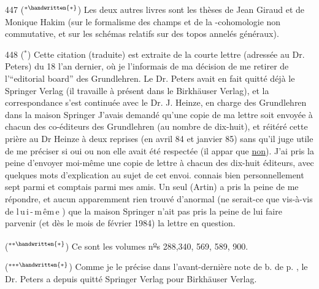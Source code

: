 
447 \quad ($^{\ast\handwritten{\ast}}$) Les deux autres livres sont les thèses de Jean Giraud et de  Monique Hakim (sur le formalisme des champs et de la -cohomologie non commutative, et sur les schémas relatifs sur des topos annelés généraux).

448 \quad ($^{\ast}$) Cette citation (traduite) est extraite de la courte lettre (adressée au Dr. Peters) du 18  l'an dernier, où je l'informais de ma décision de me retirer de l'``editorial board'' des Grundlehren. Le Dr. Peters avait en fait quitté déjà le Springer Verlag (il travaille à présent dans le Birkhäuser Verlag), et la correspondance s'est continuée avec le  Dr. J. Heinze, en charge des Grundlehren dans la maison Springer  J'avais demandé qu'une copie de ma lettre soit envoyée à chacun des co-éditeurs des Grundlehren (au nombre de dix-huit), et  réitéré cette prière au Dr Heinze\deleted{\unsure{,}} à deux reprises (en avril 84 et janvier 85) sans qu'il juge utile de me  préciser si oui ou non elle avait été respectée (il  appar que \uline{non}). J'ai pris la peine d'envoyer moi-même une copie de  lettre  à chacun des dix-huit éditeurs, avec quelques mots d'explication  au sujet de cet envoi.   connais bien personnellement sept parmi \handwritten{,}  et   comptais  parmi mes amis. Un seul \deleted{\unsure{(}} (Artin) a pris la peine de me répondre, et aucun apparemment  rien trouvé d'anormal  (ne serait-ce que vis-à-vis de \mbox{l\,u\,i\,-\,m\,êm\,e} ) que la maison Springer n'ait pas  pris la peine de lui faire parvenir   (et dès le mois de février 1984) la lettre en question.

($^{\ast\ast\handwritten{\ast}}$) Ce sont les volumes n\textsuperscript{\uline{o}}s 288,340, 569, 589, 900.

($^{\ast\ast\ast\handwritten{\ast}}$) Comme je le précise dans l'avant-dernière note de b. de p. , le Dr. Peters a depuis quitté  Springer Verlag pour Birkhäuser Verlag.

